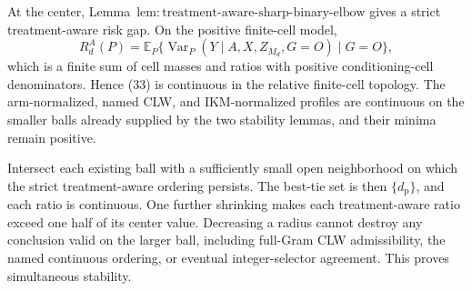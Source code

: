 At the center, Lemma~\(\mathrm{lem{:}treatment\text{-}aware\text{-}sharp\text{-}binary\text{-}elbow}\) gives a strict treatment-aware risk gap. On the positive finite-cell model,
\[
 R_d^A(P)=\mathbb E_P\{\operatorname{Var}_P(Y\mid A,X,Z_{M_d},G=O)\mid G=O\}, \tag{33}
\]
which is a finite sum of cell masses and ratios with positive conditioning-cell denominators. Hence (33) is continuous in the relative finite-cell topology. The arm-normalized, named CLW, and IKM-normalized profiles are continuous on the smaller balls already supplied by the two stability lemmas, and their minima remain positive.

Intersect each existing ball with a sufficiently small open neighborhood on which the strict treatment-aware ordering persists. The best-tie set is then \(\{d_{\mathrm p}\}\), and each ratio is continuous. One further shrinking makes each treatment-aware ratio exceed one half of its center value. Decreasing a radius cannot destroy any conclusion valid on the larger ball, including full-Gram CLW admissibility, the named continuous ordering, or eventual integer-selector agreement. This proves simultaneous stability.